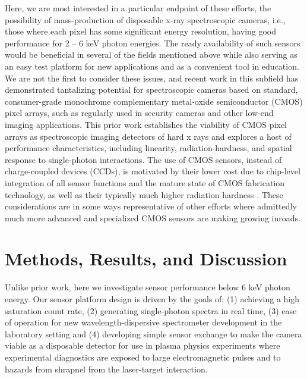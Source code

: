Here, we are most interested in a particular endpoint of these efforts,
the possibility of mass-production of disposable x-ray spectroscopic
cameras, i.e., those where each pixel has some significant energy
resolution, having good performance for 2 -- 6 keV photon energies. The
ready availability of such sensors would be beneficial in several of the
fields mentioned above while also serving as an easy test platform for
new applications and as a convenient tool in education. We are not the
first to consider these issues, and recent work in this subfield has
demonstrated tantalizing potential for spectroscopic cameras based on
standard, consumer-grade monochrome complementary metal-oxide
semiconductor (CMOS) pixel
arrays, \cite{SERVOLI2010CHARACTERIZATION, LANE2012X} such as
regularly used in security cameras and other low-end imaging
applications. This prior work establishes the viability of CMOS pixel
arrays as spectroscopic imaging detectors of hard x rays and explores a
host of performance characteristics, including linearity,
radiation-hardness, and spatial response to single-photon interactions.
The use of CMOS sensors, instead of charge-coupled devices (CCDs), is
motivated by their lower cost due to chip-level integration of all
sensor functions and the mature state of CMOS fabrication technology, as
well as their typically much higher radiation
hardness \emph{.} These
considerations are in some ways representative of other efforts where
admittedly much more advanced and specialized CMOS sensors are making
growing inroads. 

\section{Methods, Results, and Discussion}
Unlike prior work, here we investigate sensor performance below 6 keV
photon energy. Our sensor platform design is driven by the goals of: (1)
achieving a high saturation count rate, (2) generating single-photon
spectra in real time, (3) ease of operation for new
wavelength-dispersive spectrometer development in the laboratory
setting \cite{SEIDLER2014LABORATORY} and (4)
developing simple sensor exchange to make the camera viable as a
disposable detector for use in plasma physics experiments where
experimental diagnostics are exposed to large electromagnetic pulses and
to hazards from shrapnel from the laser-target interaction.

